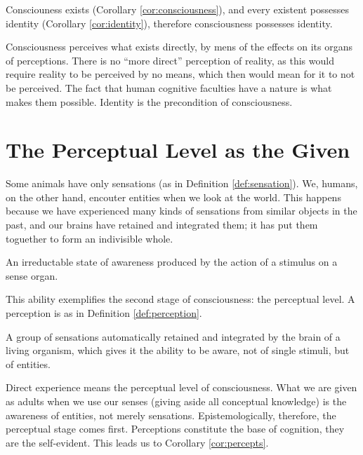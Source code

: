             \begin{remark}
                Consciouness exists (Corollary \ref{cor:consciousness}), and every existent possesses identity (Corollary \ref{cor:identity}), therefore consciousness possesses identity.
            \end{remark}
        
        Consciousness perceives what exists directly, by mens of the effects on its organs of perceptions. There is no ``more direct'' perception of reality, as this would require reality to be perceived by no means, which then would mean for it to not be perceived. The fact that human cognitive faculties have a nature is what makes them possible. Identity is the precondition of consciousness.

    \section{The Perceptual Level as the Given}

        Some animals have only sensations (as in Definition \ref{def:sensation}). We, humans, on the other hand, encouter entities when we look at the world. This happens because we have experienced many kinds of sensations from similar objects in the past, and our brains have retained and integrated them; it has put them toguether to form an indivisible whole.
            
            \begin{definition}[Sensation]
            \label{def:sensation}
                An irreductable state of awareness produced by the action of a stimulus on a sense organ.
            \end{definition}

        This ability exemplifies the second stage of consciousness: the perceptual level. A perception is as in Definition \ref{def:perception}.

            \begin{definition}[Perception]
            \label{def:perception}
                A group of sensations automatically retained and integrated by the brain of a living organism, which gives it the ability to be aware, not of single stimuli, but of entities.
            \end{definition}

        Direct experience means the perceptual level of consciousness. What we are given as adults when we use our senses (giving aside all conceptual knowledge) is the awareness of entities, not merely sensations. Epistemologically, therefore, the perceptual stage comes first. Perceptions constitute the base of cognition, they are the self-evident. This leads us to Corollary \ref{cor:percepts}.

